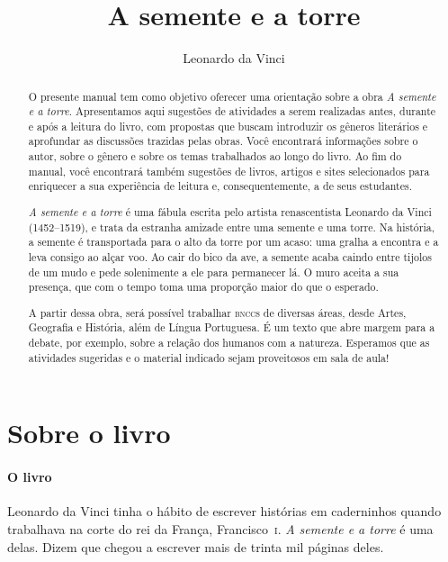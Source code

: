 \documentclass[11pt]{extarticle}
\newcommand{\AutorLivro}{Leonardo da Vinci}
\newcommand{\TituloLivro}{A semente e a torre}
\newcommand{\colaborador}{Ana Lancman}
\begin{document}
\title{\TituloLivro}
\author{\AutorLivro}
\def\authornotes{\colaborador}

\date{}
\maketitle

\tableofcontents


\begin{abstract}
O presente manual tem como objetivo oferecer uma orientação sobre a obra \textit{A semente e a torre}. Apresentamos aqui sugestões de atividades a serem realizadas antes, durante e após a leitura do livro, com propostas que buscam introduzir os gêneros literários e aprofundar as discussões trazidas pelas obras. Você encontrará informações sobre o autor, sobre o gênero e sobre os temas trabalhados ao longo do livro. Ao fim do manual, você encontrará também sugestões de livros, artigos e sites selecionados para enriquecer a sua experiência de leitura e, consequentemente, a de seus estudantes.

\textit{A semente e a torre} é uma fábula escrita pelo artista renascentista Leonardo da Vinci (1452--1519), e trata da estranha amizade entre uma semente e uma torre. Na história, a semente é transportada para o alto da torre por um acaso: uma gralha a encontra e a leva consigo ao alçar voo. Ao cair do bico da ave, a semente acaba caindo entre tijolos de um mudo e pede solenimente a ele para permanecer lá. O muro aceita a sua presença, que com o tempo toma uma proporção maior do que o esperado. 

A partir dessa obra, será possível trabalhar \textsc{bncc}s de diversas áreas, desde Artes, Geografia e História, além de Língua Portuguesa. É um texto que abre margem para a debate, por exemplo, sobre a relação dos humanos com a natureza. Esperamos que as atividades sugeridas e o material indicado sejam proveitosos em sala de aula! 

\end{abstract}

\section{Sobre o livro}

\paragraph{O livro} Leonardo da Vinci tinha o hábito de escrever histórias em caderninhos quando trabalhava na corte do rei da França, Francisco~\textsc{i}. \textit{A semente e a torre} é uma delas. Dizem que chegou a escrever mais de trinta mil páginas deles. 
\end{document}
